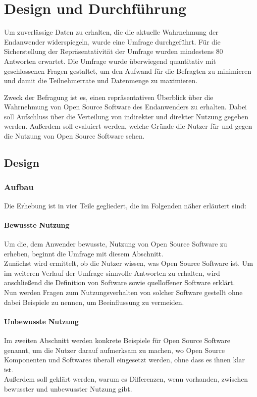 \documentclass[a4paper]{article}
\begin{document}
            
        
    \section{Design und Durchführung}
        Um zuverlässige Daten zu erhalten, die die aktuelle Wahrnehmung der Endanwender widerspiegeln, wurde eine Umfrage durchgeführt. Für die Sicherstellung der Repräsentativität der Umfrage wurden mindestens 80 Antworten erwartet.\label{section:fragestellung:answerAmount}
		Die Umfrage wurde überwiegend quantitativ mit geschlossenen Fragen gestaltet, um den Aufwand für die Befragten zu minimieren und damit die Teilnehmerrate und Datenmenge zu maximieren.  %
    
		Zweck der Befragung ist es, einen repräsentativen Überblick über die Wahrnehmung von Open Source Software des Endanwenders zu erhalten. Dabei soll Aufschluss über die Verteilung von indirekter und direkter Nutzung gegeben werden. Außerdem soll evaluiert werden, welche Gründe die Nutzer für und gegen die Nutzung von Open Source Software sehen. %
	
		\subsection{Design}
		  \subsubsection{Aufbau}
    			Die Erhebung ist in vier Teile gegliedert, die im Folgenden näher erläutert sind: 
    		   
    			\paragraph{Bewusste Nutzung}
    				Um die, dem Anwender bewusste, Nutzung von Open Source Software zu erheben, beginnt die Umfrage mit diesem Abschnitt.\\
    				Zunächst wird ermittelt, ob die Nutzer wissen, was Open Source Software ist. Um im weiteren Verlauf der Umfrage sinnvolle Antworten zu erhalten, wird anschließend die Definition von Software sowie quelloffener Software erklärt.\\
    				Nun werden Fragen zum Nutzungsverhalten von solcher Software gestellt ohne dabei Beispiele zu nennen, um Beeinflussung zu vermeiden.
    			
    			\paragraph{Unbewusste Nutzung}
    				Im zweiten Abschnitt werden konkrete Beispiele für Open Source Software genannt, um die Nutzer darauf aufmerksam zu machen, wo Open Source Komponenten und Softwares überall eingesetzt werden, ohne dass es ihnen klar ist.\\
    				Außerdem soll geklärt werden, warum es Differenzen, wenn vorhanden, zwischen bewusster und unbewusster Nutzung gibt.
    			
\end{document}
